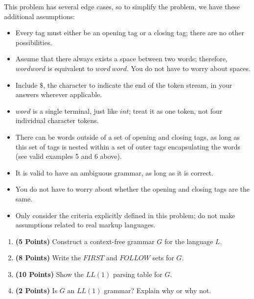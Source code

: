 \documentclass{article}[12pt]
\begin{document}
\begin{enumerate}
    This problem has several edge cases, so to simplify the problem, we have these additional assumptions:
    \begin{itemize}
        \item Every tag must either be an opening tag or a closing tag; there are no other possibilities.
        \item Assume that there always exists a space between two words; therefore, $wordword$ is equivalent to $word~word$. You do not have to worry about spaces.
        \item Include $\$$, the character to indicate the end of the token stream, in your answers wherever applicable.
        \item $word$ is a single terminal, just like $int$; treat it as one token, not four individual character tokens.
        \item There can be words outside of a set of opening and closing tags, as long as this set of tags is nested within a set of outer tags encapsulating the words (see valid examples 5 and 6 above).
        \item It is valid to have an ambiguous grammar, as long as it is correct.
        \item You do not have to worry about whether the opening and closing tags are the same.
        \item Only consider the criteria explicitly defined in this problem; do not make assumptions related to real markup languages.
    \end{itemize}
    \begin{enumerate}
        \item \textbf{(5 Points)} Construct a context-free grammar $G$ for the language $L$.
        \item \textbf{(8 Points)} Write the $FIRST$ and $FOLLOW$ sets for $G$.
        \item \textbf{(10 Points)} Show the $LL(1)$ parsing table for $G$.
        \item \textbf{(2 Points)} Is $G$ an $LL(1)$ grammar? Explain why or why not.
    \end{enumerate}

\end{enumerate}
\end{document}
